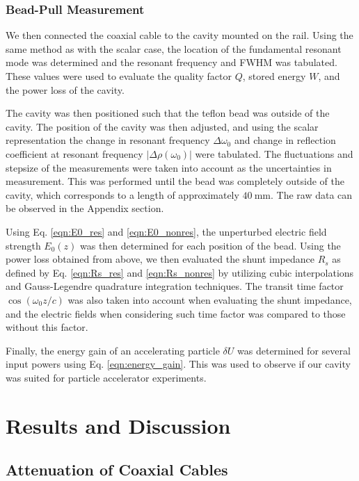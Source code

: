 \documentclass[a4paper]{report}
\numberwithin{equation}{section}
\begin{document}
\subsection{Bead-Pull Measurement}
 

We then connected the coaxial cable to the cavity mounted on the rail. Using the
same method as with the scalar case, the location of the fundamental resonant
mode was determined and the resonant frequency and FWHM was tabulated. These
values were used to evaluate the quality factor $Q$, stored energy $W$, and the
power loss of the cavity. \par 

The cavity was then positioned such that the teflon bead was outside of the
cavity. The position of the cavity was then adjusted, and using the scalar
representation the change in resonant frequency $\Delta\omega_0$ and change in
reflection coefficient at resonant frequency $|\Delta\rho(\omega_0)|$ were
tabulated. The fluctuations and stepsize of the measurements were taken into
account as the uncertainties in measurement. This was performed until the bead
was completely outside of the cavity, which corresponds to a length of
approximately $\SI{40}{\milli\metre}$. The raw data can be observed in the
Appendix section. \par 

Using Eq. \ref{eqn:E0_res} and \ref{eqn:E0_nonres}, the unperturbed electric
field strength $E_0(z)$ was then determined for each position of the bead. Using
the power loss obtained from above, we then evaluated the shunt impedance $R_s$
as defined by Eq. \ref{eqn:Rs_res} and \ref{eqn:Rs_nonres} by
utilizing cubic interpolations and Gauss-Legendre quadrature integration
techniques. The transit time factor $\cos(\omega_0 z / c)$ was also taken
into account when evaluating the shunt impedance, and the electric fields when
considering such time factor was compared to those without this factor. \par 

Finally, the energy gain of an accelerating particle $\delta U$ was determined for several
input powers using Eq. \ref{eqn:energy_gain}. This was used to observe if our cavity was suited for particle
accelerator experiments.

\chapter{Results and Discussion}

\section{Attenuation of Coaxial Cables}
\end{document}
